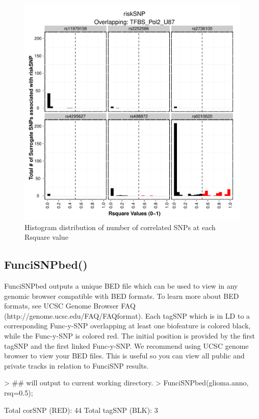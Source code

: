 \documentclass[a4paper]{article}
\begin{document}
\begin{figure}[ht!]
\begin{center}
\includegraphics{FunciSNP.0.1.7/plots/TFBS_Pol2_U87_R2summary_riskSNP.pdf}
\caption{\label{fig:TFBS_Pol2_U87_R2summary_riskSNP.pdf} Histogram 
distribution of number of correlated SNPs at each Rsquare value}
{\footnotesize{}}
\end{center}
\end{figure}


\subsection*{FunciSNPbed()}
FunciSNPbed outputs a unique BED file which can be used to view in any genomic 
browser compatible with BED formats. To learn more about BED formats, see UCSC 
Genome Browser FAQ (http://genome.ucsc.edu/FAQ/FAQformat). Each tagSNP 
which is in LD to a corresponding Func-y-SNP overlapping at least one biofeature
 is colored black, while the Func-y-SNP is colored red. The initial position is 
 provided by the first tagSNP and the first linked Func-y-SNP. We recommend 
 using UCSC genome browser to view your BED files. This is useful so you can 
 view all public and private tracks in relation to FunciSNP results.
\begin{Schunk}
\begin{Sinput}
> ## will output to current working directory.
> FunciSNPbed(glioma.anno, rsq=0.5);
\end{Sinput}
\begin{Soutput}
Total corSNP (RED):  44 
Total tagSNP (BLK):  3 
\end{Soutput}
\end{Schunk}
\end{document}
